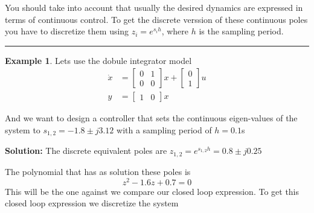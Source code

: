 \documentclass[nols]{tufte-handout}
\theoremstyle{definition}
\newtheorem{exmp}{Example}[section]
\begin{document}
You should take into account that usually the desired dynamics are expressed in terms of continuous control. To get the discrete verssion of these continuous poles you have to discretize them using   $z_i=e^{s_ih}$, where $h$ is the sampling period.


\vspace{1cm}
\hrule height 1pt
\begin{exmp}


Lets use the dobule integrator model
\begin{align*}
\dot{x}
&=
\begin{bmatrix}
0 & 1\\
0 & 0
\end{bmatrix}
x+
\begin{bmatrix}
0\\
1
\end{bmatrix}
u\\
y&=
\begin{bmatrix}
1 & 0
\end{bmatrix}
x
\end{align*}

And we want to design a controller that sets the continuous eigen-values of the system to $s_{1,2}=-1.8\pm j3.12$ with a sampling period of $h=0.1$s

    \textbf{Solution:}
The discrete equivalent poles are $z_{1,2}=e^{s_{1,2}h}=0.8\pm j0.25$

The polynomial that has as solution these poles is
\[
z^{2}-1.6z+0.7=0
\]
 This will be the one against we compare our closed loop expression. To get this closed loop expression we discretize the system


\end{exmp}
\end{document}
